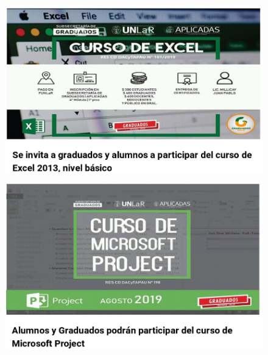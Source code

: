 \documentclass{fancyslides}
\begin{document}
\begin{frame}
\begin{figure}
	\centering
	\includegraphics[width=1\linewidth]{images/excel}
	\caption{}
	\label{fig:excel}
\end{figure}

\end{frame}

\begin{frame}
\begin{figure}
	\centering
	\includegraphics[width=1\linewidth]{images/msproject}
	\caption{}
	\label{fig:msproject}
\end{figure}
\end{frame}
\end{document}
